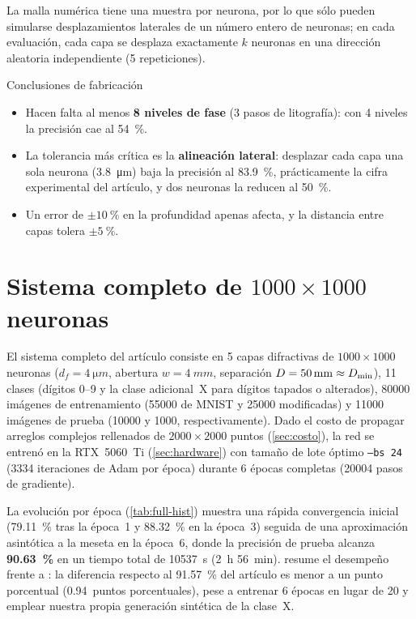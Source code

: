 La malla numérica tiene una muestra por neurona, por lo que sólo pueden simularse
desplazamientos laterales de un número entero de neuronas; en cada evaluación, cada capa se
desplaza exactamente $k$ neuronas en una dirección aleatoria independiente (5 repeticiones).

\begin{resultado}{Conclusiones de fabricación}
\begin{itemize}
  \item Hacen falta al menos \textbf{8 niveles de fase} (3 pasos de litografía): con 4 niveles la
  precisión cae al \SI{54}{\percent}.
  \item La tolerancia más crítica es la \textbf{alineación lateral}: desplazar cada capa una
  sola neurona (\SI{3.8}{\micro m}) baja la precisión al \SI{83.9}{\percent}, prácticamente la
  cifra experimental del artículo, y dos neuronas la reducen al \SI{50}{\percent}.
  \item Un error de $\pm\SI{10}{\percent}$ en la profundidad apenas afecta, y la distancia entre
  capas tolera $\pm\SI{5}{\percent}$.
\end{itemize}
\end{resultado}

\FloatBarrier
\section{Sistema completo de \texorpdfstring{$1000\times1000$}{1000x1000} neuronas}\label{sec:sistema-completo}

El sistema completo del artículo consiste en 5 capas difractivas de $1000\times1000$ neuronas
($d_f=\SI{4}{\micro m}$, abertura $w=\SI{4}{mm}$, separación $D=\SI{50}{mm}\approx D_{\min}$),
11 clases (dígitos 0--9 y la clase adicional~X para dígitos tapados o alterados),
\num{80000} imágenes de entrenamiento (\num{55000} de MNIST y \num{25000} modificadas) y
\num{11000} imágenes de prueba (\num{10000} y \num{1000}, respectivamente). Dado el costo de
propagar arreglos complejos rellenados de $2000\times2000$ puntos (\cref{sec:costo}), la red se
entrenó en la RTX~5060~Ti (\cref{sec:hardware}) con tamaño de lote óptimo \texttt{--bs 24}
(\num{3334} iteraciones de Adam por época) durante 6 épocas completas (\num{20004} pasos de
gradiente).

La evolución por época (\cref{tab:full-hist}) muestra una rápida convergencia inicial
(\SI{79.11}{\percent} tras la época~1 y \SI{88.32}{\percent} en la época~3) seguida de una
aproximación asintótica a la meseta en la época~6, donde la precisión de prueba alcanza
\textbf{\SI{90.63}{\percent}} en un tiempo total de \SI{10537}{s} (\SI{2}{h} \SI{56}{min}).
 resume el desempeño frente a \textcite{chen2021}: la diferencia respecto al
\SI{91.57}{\percent} del artículo es menor a un punto porcentual (\num{0.94}~puntos porcentuales), pese a
entrenar 6 épocas en lugar de 20 y emplear nuestra propia generación sintética de la clase~X.

